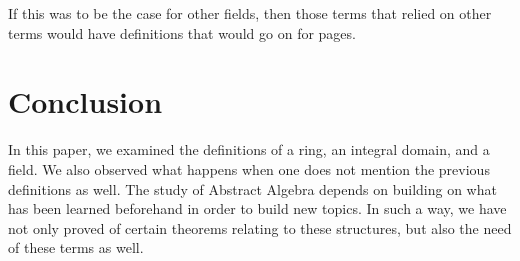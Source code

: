 \documentclass{article}
\begin{document}
If this was to be the case for other fields, then those terms that relied on other terms would have definitions that would go on for pages.


\section*{Conclusion}

In this paper, we examined the definitions of a ring, an integral domain, and a field. We also observed what happens when one does not mention the previous definitions as well. The study of Abstract Algebra depends on building on what has been learned beforehand
in order to build new topics. In such a way, we have not only proved of certain theorems relating to these structures, but also the 
need of these terms as well.


{}
\end{document}
